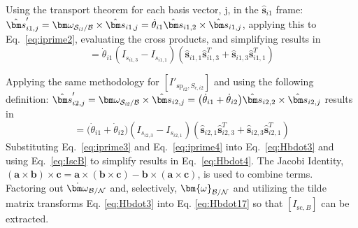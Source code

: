 Using the transport theorem for each basis vector, j, in the $\bm{\hat{s}}_{i1}$ frame: $\hat{\bm s}'_{i1,j} = \bm\omega_{\cal{S}_{\textit{i1}}/\cal{B}}\times\hat{\bm s}_{i1,j}=\dot{\theta}_{i1}\hat{\bm s}_{i1,2}\times\hat{\bm s}_{i1,j}$, applying this to Eq.~\eqref{eq:iprime2}, evaluating the cross products, and simplifying results in
\begin{equation}
	[I'_{\text{sp}_{i1},S_{c,i1}}] = \dot{\theta}_{i1}(I_{s_{i1,3}}-I_{s_{i1,1}})(\hat{\bm s}_{i1,1}\hat{\bm s}_{i1,3}^{T}+\hat{\bm s}_{i1,3}\hat{\bm s}_{i1,1}^{T})
	\label{eq:iprime3}
\end{equation}

Applying the same methodology for $[I'_{\text{sp}_{i2},S_{c,i2}}]$ and using the following definition: $\hat{\bm s}'_{i2,j} = \bm\omega_{\cal{S}_{\textit{i2}}/\cal{B}}\times\hat{\bm s}_{i2,j}=\big(\dot{\theta}_{i1} + \dot{\theta}_{i2} \big)\hat{\bm s}_{i2,2}\times\hat{\bm s}_{i2,j}$ results in
\begin{equation}
	[I'_{\text{sp}_{i2},S_{c,i2}}] = \big(\dot{\theta}_{i1}+\dot{\theta}_{i2}\big)(I_{s_{i2,3}}-I_{s_{i2,1}})(\hat{\bm s}_{i2,1}\hat{\bm s}_{i2,3}^{T}+\hat{\bm s}_{i2,3}\hat{\bm s}_{i2,1}^{T})
	\label{eq:iprime4}
\end{equation}
Substituting Eq.~\eqref{eq:iprime3} and Eq.~\eqref{eq:iprime4} into Eq.~\eqref{eq:Hbdot3} and using Eq.~\eqref{eq:IscB} to simplify results in Eq.~\eqref{eq:Hbdot4}. The Jacobi Identity, $(\bm a \times \bm b)\times \bm c = \bm a \times (\bm b\times \bm c) - \bm b \times (\bm a\times \bm c)$, is used to combine terms.\\
Factoring out $\dot{\bm\omega}_{\cal B/N}$ and, selectively, $\bm{\omega}_{\cal B/N}$ and utilizing the tilde matrix transforms Eq. \ref{eq:Hbdot3} into Eq. \ref{eq:Hbdot17} so that $[I_{\text{sc},B}]$ can be extracted.

